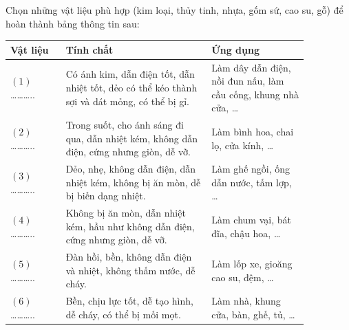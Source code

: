 \documentclass[Main.tex]{subfiles}
\begin{document}
\begin{bt}%
	Chọn những vật liệu phù hợp (kim loại, thủy tinh, nhựa, gốm sứ, cao su, gỗ) để hoàn thành bảng thông tin sau:
	\begin{center}
		\renewcommand{\arraystretch}{1.15}
		\begin{tabular}{|L{0.16\linewidth}|L{0.42\linewidth}|L{0.28\linewidth}|}
			\hline
			\textbf{Vật liệu} & \textbf{Tính chất} & \textbf{Ứng dụng} \\
			\hline
			$(1)$ ……….. & Có ánh kim, dẫn điện tốt, dẫn nhiệt tốt, dẻo có thể kéo thành sợi và dát mỏng, có thể bị gỉ. & Làm dây dẫn điện, nồi đun nấu, làm cầu cống, khung nhà cửa, … \\
			\hline
			$(2)$ ……….. & Trong suốt, cho ánh sáng đi qua, dẫn nhiệt kém, không dẫn điện, cứng nhưng giòn, dễ vỡ. & Làm bình hoa, chai lọ, cửa kính, … \\
			\hline
			$(3)$ ……….. & Dẻo, nhẹ, không dẫn điện, dẫn nhiệt kém, không bị ăn mòn, dễ bị biến dạng nhiệt. & Làm ghế ngồi, ống dẫn nước, tấm lợp, … \\
			\hline
			$(4)$ ……….. & Không bị ăn mòn, dẫn nhiệt kém, hầu như không dẫn điện, cứng nhưng giòn, dễ vỡ. & Làm chum vại, bát đĩa, chậu hoa, … \\
			\hline
			$(5)$ ……….. & Đàn hồi, bền, không dẫn điện và nhiệt, không thấm nước, dễ cháy. & Làm lốp xe, gioăng cao su, đệm, … \\
			\hline
			$(6)$ ……….. & Bền, chịu lực tốt, dễ tạo hình, dễ cháy, có thể bị mối mọt. & Làm nhà, khung cửa, bàn, ghế, tủ, … \\
			\hline
		\end{tabular}
	\end{center}
\end{bt}
\end{document}
